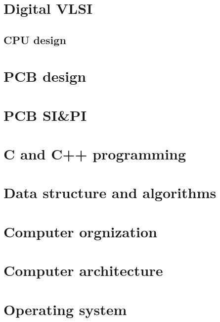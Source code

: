 \documentclass[UTF8]{book}
\begin{document}
	\part{Digital VLSI}
	\label{Digital VLSI}
	\chapter{CPU design}
	\label{CPU design}
	
	\part{PCB design}
	\label{PCB design}
	
	\part{PCB SI\&PI}
	
	\part{C and C++ programming}
	
	\part{Data structure and algorithms}
	
	\part{Computer orgnization}
	
	\part{Computer architecture}
	
	\begin{comment} 
	rather stupid, but helpful 
	\chapter{Microcontroller}
	\chapter{Digital signal processor}
	\chapter{ARM processor}
	\end{comment}

	\part{Operating system}
	
\end{document}
